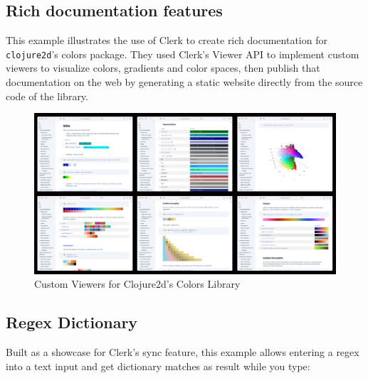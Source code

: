 \documentclass[sigconf,screen]{acmart}
\newcommand{\passthrough}[1]{#1}
\begin{document}
\hypertarget{id}{%
\subsection{Rich documentation features}\label{id}}

This example illustrates the use of Clerk to create rich documentation for \passthrough{\lstinline!clojure2d!}'s colors package. They used Clerk's Viewer API to implement custom viewers to visualize colors, gradients and color spaces, then publish that documentation on the web by generating a static website directly from the source code of the library.

\begin{figure}[H]
\centering
\includegraphics{images/custom-viewers-for-clojure2ds-colors-library.png}
\caption{Custom Viewers for Clojure2d's Colors Library}
\end{figure}

\hypertarget{id}{%
\subsection{Regex Dictionary}\label{id}}

Built as a showcase for Clerk's sync feature, this example allows entering a regex into a text input and get dictionary matches as result while you type:
\end{document}
